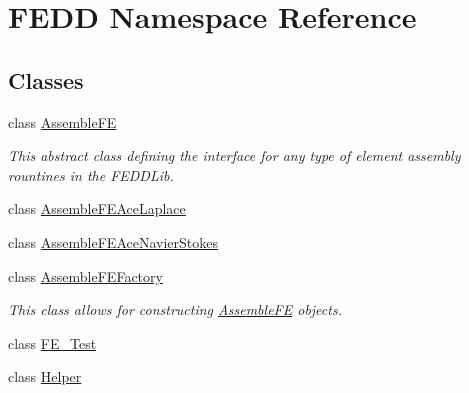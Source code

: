 \hypertarget{namespaceFEDD}{}\section{F\+E\+DD Namespace Reference}
\label{namespaceFEDD}
\subsection*{Classes}
\begin{DoxyCompactItemize}
\item 
class \hyperlink{classFEDD_1_1AssembleFE}{Assemble\+FE}
\begin{DoxyCompactList}\small\item\em This abstract class defining the interface for any type of element assembly rountines in the F\+E\+D\+D\+Lib. \end{DoxyCompactList}\item 
class \hyperlink{classFEDD_1_1AssembleFEAceLaplace}{Assemble\+F\+E\+Ace\+Laplace}
\item 
class \hyperlink{classFEDD_1_1AssembleFEAceNavierStokes}{Assemble\+F\+E\+Ace\+Navier\+Stokes}
\item 
class \hyperlink{classFEDD_1_1AssembleFEFactory}{Assemble\+F\+E\+Factory}
\begin{DoxyCompactList}\small\item\em This class allows for constructing \hyperlink{classFEDD_1_1AssembleFE}{Assemble\+FE} objects. \end{DoxyCompactList}\item 
class \hyperlink{classFEDD_1_1FE__Test}{F\+E\+\_\+\+Test}
\item 
class \hyperlink{classFEDD_1_1Helper}{Helper}
\end{DoxyCompactItemize}
